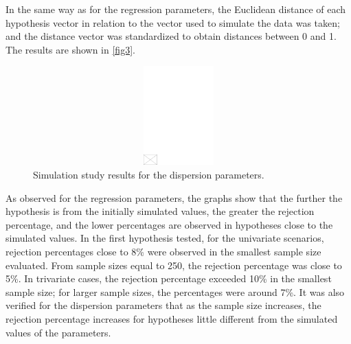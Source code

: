 \documentclass[AMA,STIX1COL]{WileyNJD-v2}
\begin{document}
In the same way as for the regression parameters, the Euclidean distance of each hypothesis vector in relation to the vector used to simulate the data was taken; and the distance vector was standardized to obtain distances between 0 and 1. The results are shown in \autoref{fig3}.

\begin{figure}[h]
\centerline{\includegraphics[width=342pt,height=9pc,draft]{empty}}
\caption{Simulation study results for the dispersion parameters.\label{fig3}}
\end{figure}

As observed for the regression parameters, the graphs show that the further the hypothesis is from the initially simulated values, the greater the rejection percentage, and the lower percentages are observed in hypotheses close to the simulated values. In the first hypothesis tested, for the univariate scenarios, rejection percentages close to 8\% were observed in the smallest sample size evaluated. From sample sizes equal to 250, the rejection percentage was close to 5\%. In trivariate cases, the rejection percentage exceeded 10\% in the smallest sample size; for larger sample sizes, the percentages were around 7\%. It was also verified for the dispersion parameters that as the sample size increases, the rejection percentage increases for hypotheses little different from the simulated values of the parameters.
\end{document}
